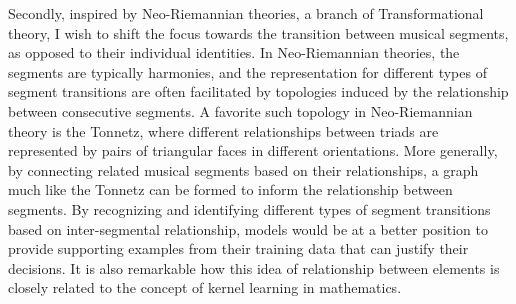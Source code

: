 Secondly, inspired by Neo-Riemannian theories, a branch of Transformational theory, I wish to shift the focus towards the transition between musical segments, as opposed to their individual identities.
In Neo-Riemannian theories, the segments are typically harmonies, and the representation for different types of segment transitions are often facilitated by topologies induced by the relationship between consecutive segments.
A favorite such topology in Neo-Riemannian theory is the Tonnetz, where different relationships between triads are represented by pairs of triangular faces in different orientations. 
More generally, by connecting related musical segments based on their relationships, a graph much like the Tonnetz can be formed to inform the relationship between segments. 
By recognizing and identifying different types of segment transitions based on inter-segmental relationship, models would be at a better position to provide supporting examples from their training data that can justify their decisions.
It is also remarkable how this idea of relationship between elements is closely related to the concept of kernel learning in mathematics.


